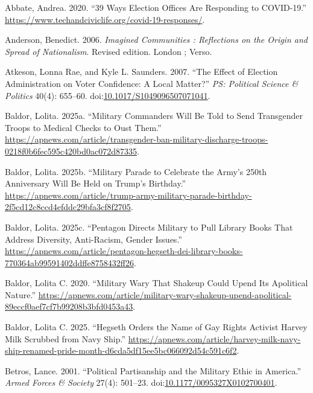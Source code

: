 \documentclass[
  12pt,
  letterpaper,
]{article}
\newlength{\cslhangindent}
\newenvironment{CSLReferences}[2] %
 {\begin{list}{}{%
  \setlength{\itemindent}{0pt}
  \setlength{\leftmargin}{0pt}
  \setlength{\parsep}{0pt}
  \ifodd #1
   \setlength{\leftmargin}{\cslhangindent}
   \setlength{\itemindent}{-1\cslhangindent}
  \fi
  \setlength{\itemsep}{#2\baselineskip}}}
 {\end{list}}
\begin{document}
\label{refs}
\begin{CSLReferences}{1}{1}
Abbate, Andrea. 2020. {``39 {Ways Election Offices} Are {Responding} to
{COVID-19}.''}
\url{https://www.techandciviclife.org/covid-19-responses/}.

Anderson, Benedict. 2006. \emph{Imagined Communities : Reflections on
the Origin and Spread of Nationalism}. Revised edition. London ; Verso.

Atkeson, Lonna Rae, and Kyle L. Saunders. 2007. {``The {Effect} of
{Election Administration} on {Voter Confidence}: {A Local Matter}?''}
\emph{PS: Political Science \& Politics} 40(4): 655--60.
doi:\href{https://doi.org/10.1017/S1049096507071041}{10.1017/S1049096507071041}.

Baldor, Lolita. 2025a. {``Military Commanders Will Be Told to Send
Transgender Troops to Medical Checks to Oust Them.''}
\url{https://apnews.com/article/transgender-ban-military-discharge-troops-0218f0b6fec595c420bd0ac072d87335}.

Baldor, Lolita. 2025b. {``Military Parade to Celebrate the {Army}'s
250th Anniversary Will Be Held on {Trump}'s Birthday.''}
\url{https://apnews.com/article/trump-army-military-parade-birthday-2f5cd12c8ccd4efddc29bfa3cf8f2705}.

Baldor, Lolita. 2025c. {``Pentagon Directs Military to Pull Library
Books That Address Diversity, Anti-Racism, Gender Issues.''}
\url{https://apnews.com/article/pentagon-hegseth-dei-library-books-770364ab99591402ddffe8758432ff26}.

Baldor, Lolita C. 2020. {``Military Wary That Shakeup Could Upend Its
Apolitical Nature.''}
\url{https://apnews.com/article/military-wary-shakeup-upend-apolitical-89eccf0aef7cf7b99208b3bfd0453a43}.

Baldor, Lolita C. 2025. {``Hegseth Orders the Name of Gay Rights
Activist {Harvey Milk} Scrubbed from {Navy} Ship.''}
\url{https://apnews.com/article/harvey-milk-navy-ship-renamed-pride-month-d6cda5df15ee5bc066092d54c591c6f2}.

Betros, Lance. 2001. {``Political {Partisanship} and the {Military
Ethic} in {America}.''} \emph{Armed Forces \& Society} 27(4): 501--23.
doi:\href{https://doi.org/10.1177/0095327X0102700401}{10.1177/0095327X0102700401}.


\end{CSLReferences}
\end{document}
